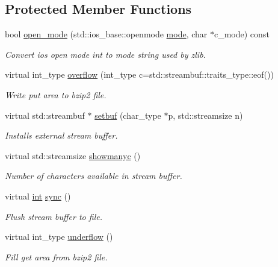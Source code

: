 \subsection*{Protected Member Functions}
\begin{DoxyCompactItemize}
\item 
bool \hyperlink{classbzfilebuf_ac66986ba4c5da71eb693476fa1df6371}{open\+\_\+mode} (std\+::ios\+\_\+base\+::openmode \hyperlink{ioapi_8h_ab77191763734fbb3e515371393ccb606}{mode}, char $\ast$c\+\_\+mode) const
\begin{DoxyCompactList}\small\item\em Convert ios open mode int to mode string used by zlib. \end{DoxyCompactList}\item 
virtual int\+\_\+type \hyperlink{classbzfilebuf_aac23c07f79d6c8ba4406d01e3bf4cf56}{overflow} (int\+\_\+type c=std\+::streambuf\+::traits\+\_\+type\+::eof())
\begin{DoxyCompactList}\small\item\em Write put area to bzip2 file. \end{DoxyCompactList}\item 
virtual std\+::streambuf $\ast$ \hyperlink{classbzfilebuf_a0969887ed38fdcdcfc5817b2c5b6a711}{setbuf} (char\+\_\+type $\ast$p, std\+::streamsize n)
\begin{DoxyCompactList}\small\item\em Installs external stream buffer. \end{DoxyCompactList}\item 
virtual std\+::streamsize \hyperlink{classbzfilebuf_aa21eab2632749a91a1d9a6e7af6bbe34}{showmanyc} ()
\begin{DoxyCompactList}\small\item\em Number of characters available in stream buffer. \end{DoxyCompactList}\item 
virtual \hyperlink{lp__lib_8h_adeb9ec6400320e4923ac9d836d509ddb}{int} \hyperlink{classbzfilebuf_a75bcbd53c2acda4768c045777bc7baf2}{sync} ()
\begin{DoxyCompactList}\small\item\em Flush stream buffer to file. \end{DoxyCompactList}\item 
virtual int\+\_\+type \hyperlink{classbzfilebuf_a64837fcfe73bd81f226d0cdb47845ef8}{underflow} ()
\begin{DoxyCompactList}\small\item\em Fill get area from bzip2 file. \end{DoxyCompactList}\end{DoxyCompactItemize}


